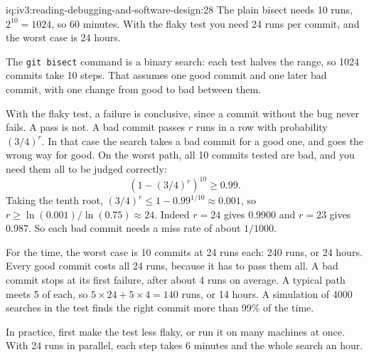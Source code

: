 \begin{solution}{iq:iv3:reading-debugging-and-software-design:28}
The plain bisect needs 10 runs, $2^{10} = 1024$, so 60 minutes. With the flaky test you need 24 runs per commit, and the worst case is 24 hours.

The \texttt{git bisect} command is a binary search: each test halves the range, so 1024 commits take 10 steps. That assumes one good commit and one later bad commit, with one change from good to bad between them.

With the flaky test, a failure is conclusive, since a commit without the bug never fails. A pass is not. A bad commit passes $r$ runs in a row with probability $(3/4)^r$. In that case the search takes a bad commit for a good one, and goes the wrong way for good. On the worst path, all 10 commits tested are bad, and you need them all to be judged correctly:
\[
\left(1 - (3/4)^r\right)^{10} \ge 0.99.
\]
Taking the tenth root, $(3/4)^r \le 1 - 0.99^{1/10} \approx 0.001$, so $r \ge \ln(0.001) / \ln(0.75) \approx 24$. Indeed $r = 24$ gives 0.9900 and $r = 23$ gives 0.987. So each bad commit needs a miss rate of about $1/1000$.

For the time, the worst case is 10 commits at 24 runs each: 240 runs, or 24 hours. Every good commit costs all 24 runs, because it has to pass them all. A bad commit stops at its first failure, after about 4 runs on average. A typical path meets 5 of each, so $5 \times 24 + 5 \times 4 = 140$ runs, or 14 hours. A simulation of 4000 searches in the test finds the right commit more than 99\% of the time.

In practice, first make the test less flaky, or run it on many machines at once. With 24 runs in parallel, each step takes 6 minutes and the whole search an hour.


\end{solution}

